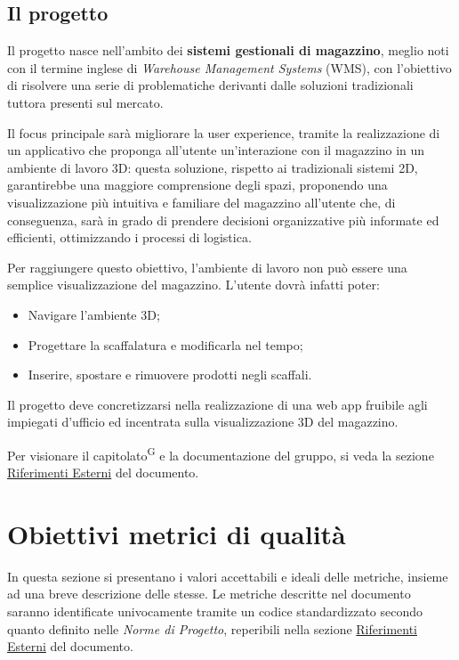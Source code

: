 \subsection{Il progetto}\label{sec:il_progetto}
\par Il progetto nasce nell'ambito dei \textbf{sistemi gestionali di magazzino}, meglio noti con il termine inglese di \textit{Warehouse Management Systems} (WMS), con l'obiettivo di risolvere una serie di problematiche derivanti dalle soluzioni tradizionali tuttora presenti sul mercato.
\par Il focus principale sarà migliorare la user experience, tramite la realizzazione di un applicativo che proponga all'utente un'interazione con il magazzino in un ambiente di lavoro 3D: questa soluzione, rispetto ai tradizionali sistemi 2D, garantirebbe una maggiore comprensione degli spazi, proponendo una visualizzazione più intuitiva e familiare del magazzino all'utente che, di conseguenza, sarà in grado di prendere decisioni organizzative più informate ed efficienti, ottimizzando i processi di logistica.
\par Per raggiungere questo obiettivo, l'ambiente di lavoro non può essere una semplice visualizzazione del magazzino. L'utente dovrà infatti poter:
\begin{itemize}
    \item Navigare l'ambiente 3D;
    \item Progettare la scaffalatura e modificarla nel tempo;
    \item Inserire, spostare e rimuovere prodotti negli scaffali.
\end{itemize}
Il progetto deve concretizzarsi nella realizzazione di una web app fruibile agli impiegati d'ufficio ed incentrata sulla visualizzazione 3D del magazzino.
\par Per visionare il capitolato\textsuperscript{G} e la documentazione del gruppo, si veda la sezione \hyperref[sec:riferimenti_esterni]{Riferimenti Esterni} del documento.

\newpage

\section{Obiettivi metrici di qualità}\label{sec:obiettivi_metrici}
In questa sezione si presentano i valori accettabili e ideali delle metriche, insieme ad una breve descrizione delle stesse. Le metriche descritte nel documento saranno identificate univocamente tramite un codice standardizzato secondo quanto definito nelle \textit{Norme di Progetto}, reperibili nella sezione \hyperref[sec:riferimenti_esterni]{Riferimenti Esterni} del documento.

